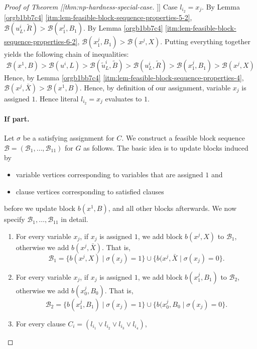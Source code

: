 \documentclass[fontsize=11pt,paper=a4]{book}
\begin{document}
\begin{proof}[Proof of Theorem [[thm:np-hardness-special-case]]]
Case \(l_{i_2}=x_j\).
By Lemma \ref{orgb1bb7c4} \ref{itm:lem-feasible-block-sequence-properties-5-2}, \(\mathcal{B}(u_L^i,\tilde{R})>\mathcal{B}(x_1^j,B_1)\).
By Lemma \ref{orgb1bb7c4} \ref{itm:lem-feasible-block-sequence-properties-6-2}, \(\mathcal{B}(x_1^j,B_1)>\mathcal{B}(x^j,X)\).
Putting everything together yields the following chain of inequalities:
\[
\mathcal{B}(x^1,B)>
\mathcal{B}(u^i,L)>
\mathcal{B}(\tilde{u}_L^i,\tilde{B})>
\mathcal{B}(u_L^i,\tilde{R})>
\mathcal{B}(x_1^j,B_1)>
\mathcal{B}(x^j,X)
\]
Hence, by Lemma \ref{orgb1bb7c4} \ref{itm:lem-feasible-block-sequence-properties-4}, \(\mathcal{B}(x^j,\bar{X})>\mathcal{B}(x^1,B)\).
Hence, by definition of our assignment, variable \(x_j\) is assigned \(1\).
Hence literal \(l_{i_2}=x_j\) evaluates to \(1\).

\paragraph{If part.}
Let \(\sigma\) be a satisfying assignment for \(C\).
We construct a feasible block sequence \(\mathcal{B}=(\mathscr{B}_1,\dots,\mathscr{B}_{11})\) for \(G\) as follows.
The basic idea is to update blocks induced by

\begin{itemize}
\item variable vertices corresponding to variables that are assigned \(1\) and

\item clause vertices corresponding to satisfied clauses
\end{itemize}


before we update block \(b(x^1,B)\), and all other blocks afterwards.
We now specify \(\mathscr{B}_1,\dots,\mathscr{B}_{11}\) in detail.

\begin{enumerate}
\item For every variable \(x_j\), if \(x_j\) is assigned \(1\), we add block \(b(x^j,X)\) to \(\mathscr{B}_1\), otherwise we add \(b(x^j,\bar{X})\).
That is,
\[
   \mathscr{B}_1=\{b(x^j,X)\mid\sigma(x_j)=1\}\cup\{b(x^j,\bar{X}\mid\sigma(x_j)=0\}.
   \]

\item For every variable \(x_j\), if \(x_j\) is assigned \(1\), we add block \(b(x_1^j,B_1)\) to \(\mathscr{B}_2\), otherwise we add \(b(x_0^j,B_0)\).
That is,
\[
   \mathscr{B}_2=\{b(x_1^j,B_1)\mid\sigma(x_j)=1\}\cup\{b(x_0^j,B_0\mid\sigma(x_j)=0\}.
   \]

\item For every clause \(C_i=(l_{i_1}\vee l_{i_2}\vee l_{i_3}\vee l_{i_4})\),


\end{enumerate}
\end{proof}
\end{document}
